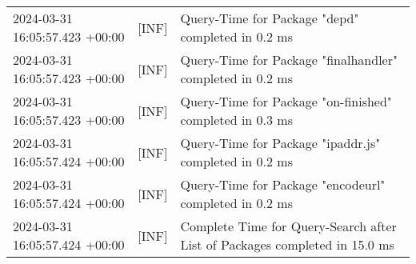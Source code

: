 {{\begin{tabularx}{\textwidth}{|l|l|X|}
                    2024-03-31 16:05:57.423 +00:00 & [INF] & Query-Time for Package "depd" completed in 0.2 ms \\
                    2024-03-31 16:05:57.423 +00:00 & [INF] & Query-Time for Package "finalhandler" completed in 0.2 ms \\
                    2024-03-31 16:05:57.423 +00:00 & [INF] & Query-Time for Package "on-finished" completed in 0.3 ms \\
                    2024-03-31 16:05:57.424 +00:00 & [INF] & Query-Time for Package "ipaddr.js" completed in 0.2 ms \\
                    2024-03-31 16:05:57.424 +00:00 & [INF] & Query-Time for Package "encodeurl" completed in 0.2 ms \\
                    2024-03-31 16:05:57.424 +00:00 & [INF] & Complete Time for Query-Search after List of Packages completed in 15.0 ms \\
                    \hline
                \end{tabularx}
            }
        }
